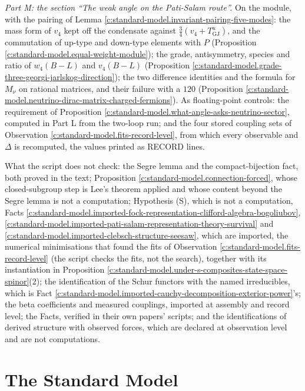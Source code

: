 \documentclass[11pt]{article}
\theoremstyle{definition}
\theoremstyle{plain}
\begin{document}
\emph{Part M: the section ``The weak angle on the Pati-Salam route''.} On the module, with the pairing of Lemma \ref{c:standard-model.invariant-pairing-five-modes}: the mass form of $v_{4}$ kept off the condensate against $\tfrac34(v_{4} + T^{u}_{\mathrm{GJ}})$, and the commutation of up-type and down-type elements with $P$ (Proposition \ref{c:standard-model.equal-weight-module}); the grade, antisymmetry, species and ratio of $w_{4}(B - L)$ and $v_{4}(B - L)$ (Proposition \ref{c:standard-model.grade-three-georgi-jarlskog-direction}); the two difference identities and the formula for $M_{\nu}$ on rational matrices, and their failure with a $120$ (Proposition \ref{c:standard-model.neutrino-dirac-matrix-charged-fermions}). As floating-point controls: the requirement of Proposition \ref{c:standard-model.what-angle-asks-neutrino-sector}, computed in Part L from the two-loop run; and the four stored coupling sets of Observation \ref{c:standard-model.fits-record-level}, from which every observable and $\Delta$ is recomputed, the values printed as RECORD lines.

What the script does not check: the Segre lemma and the compact-bijection fact, both proved in the text; Proposition \ref{c:standard-model.connection-forced}, whose closed-subgroup step is Lee's theorem applied and whose content beyond the Segre lemma is not a computation; Hypothesis (S), which is not a computation, Facts \ref{c:standard-model.imported-fock-representation-clifford-algebra-bogoliubov}, \ref{c:standard-model.imported-pati-salam-representation-theory-survival} and \ref{c:standard-model.imported-clebsch-structure-seesaw}, which are imported, the numerical minimisations that found the fits of Observation \ref{c:standard-model.fits-record-level} (the script checks the fits, not the search), together with its instantiation in Proposition \ref{c:standard-model.under-s-composites-state-space-spinor}(2); the identification of the Schur functors with the named irreducibles, which is Fact \ref{c:standard-model.imported-cauchy-decomposition-exterior-power}'s; the beta coefficients and measured couplings, imported at assembly and record level; the Facts, verified in their own papers' scripts; and the identifications of derived structure with observed forces, which are declared at observation level and are not computations.

\section{The Standard Model}
\end{document}
